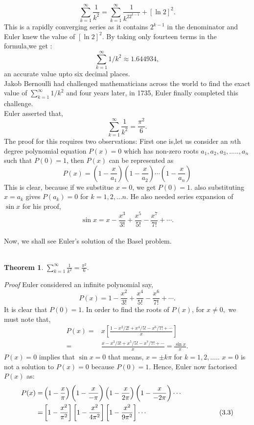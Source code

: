 \documentclass[a4paper,reqno,11pt]{book}
\theoremstyle{plain}%
\newtheorem{thm}{Theorem}[chapter]
\theoremstyle{definition}
\begin{document}
$$\sum_{k=1}^{\infty}\frac{1}{k^2} = \sum_{k=1}^{\infty}\frac{1}{k^22^{k-1}}  + [\ln2]^2.$$
This is a rapidly converging series as it contains $2^{k-1}$ in the denominator and Euler knew the value of $[\ln2]^2$. By taking only fourteen terms in the formula,we get : $$\sum_{k=1}^{\infty}1/k^2 \approx 1.644934,$$ an accurate value upto six decimal places.\\
Jakob Bernoulli had challenged mathematicians across the world to find the 
exact value of $\sum_{k=1}^{\infty}1/k^2$ and four years later, in 1735, Euler finally completed this challenge.\\
\indent Euler asserted that,\\
$$\sum_{k=1}^{\infty}\frac{1}{k^2} = \frac{\pi^2}{6}.$$
The proof for this requires two observations: First one is,let us consider an $n$th degree polynomial equation $P(x) = 0$ which has non-zero roots $a_{1},a_{2},a_{3},.....,a_{n}$ such that $P(0) = 1$, then $P(x)$ can be represented as
$$P(x) = \left(1-\frac{x}{a_{1}}\right)\left(1-\frac{x}{a_{2}}\right)\cdots\left(1-\frac{x}{a_{n}}\right)$$
This is clear, because if we substitue $x = 0$, we get $P(0) = 1.$ also substituting $x = a_{k}$ gives $P(a_{k}) = 0$ for $k = 1, 2, ... n.$ He also needed series expansion of $\sin x$ for his proof,
$$\sin x = x - \frac{x^3}{3!} + \frac{x^5}{5!} - \frac{x^7}{7!} + \cdots.$$
\\
Now, we shall see Euler's solution of the Basel problem.\\
\\
\begin{thm}\label{thm:Type 1} $\sum_{k=1}^{\infty}\frac{1}{k^2} = \frac{\pi^2}{6}.$\\
\end{thm}
\textit{Proof}
Euler considered an infinite polynomial say,\\
$$P(x) = 1 - \frac{x^2}{3!} + \frac{x^4}{5!} - \frac{x^6}{7!} + \cdots.$$
It is clear that $P(0) = 1.$ In order to find the roots of $P(x)$, for $x \neq 0,$ we must note that,
\begin{align*}
P(x) =& x\left[\frac{1 - x^2/2! + x^4/5! - x^6/7! + \cdots}{x}\right]\\
=& \frac{x - x^3/3! + x^5/5! - x^7/7! + \cdots}{x} = \frac{\sin x}{x}.
\end{align*}
$P(x) = 0$ implies that $\sin x = 0$ that means, $x = \pm k\pi$ for 
$k = 1, 2,....$. $x = 0$ is not a solution to $P(x) = 0$ because $P(0) = 1$. 
Hence, Euler now factorised $P(x)$ as:\\
\begin{align*}
P(x) =& \left(1 - \frac{x}{\pi}\right)\left(1 - \frac{x}{-\pi}\right)\left(1 - \frac{x}{2\pi}\right)\left(1 - \frac{x}{-2\pi}\right)\cdots\\
=& \left[1 - \frac{x^2}{\pi^2}\right]\left[1 - \frac{x^2}{4\pi^2}\right]\left[1 - \frac{x^2}{9\pi^2}\right]\cdots \hspace{3.7cm} (3.3)
\end{align*}
\end{document}
